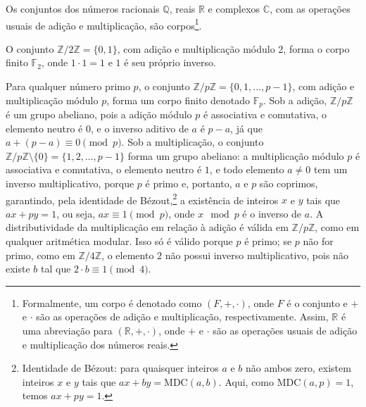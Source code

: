 \begin{example}
Os conjuntos dos números racionais $\mathbb{Q}$, reais $\mathbb{R}$ e complexos $\mathbb{C}$,
com as operações usuais de adição e multiplicação, são corpos\footnote{Formalmente, um corpo
  é denotado como $(F, +, \cdot)$, onde $F$ é o conjunto e $+$ e $\cdot$ são as operações de
  adição e multiplicação, respectivamente. Assim, $\mathbb{R}$ é uma abreviação para 
  $(\mathbb{R}, +, \cdot)$, onde $+$ e $\cdot$ são as operações usuais de adição e 
  multiplicação dos números reais.}.
\end{example}

\begin{example}
O conjunto $\mathbb{Z}/2\mathbb{Z} = \{0, 1\}$, com adição e multiplicação módulo 2,
forma o corpo finito $\mathbb{F}_2$, onde $1 \cdot 1 = 1$ e $1$ é seu próprio inverso.
\end{example}

\begin{example}
Para qualquer número primo $p$, o conjunto
$\mathbb{Z}/p\mathbb{Z} = \{0, 1, \ldots, p-1\}$, com adição e multiplicação
módulo $p$, forma um corpo finito denotado $\mathbb{F}_p$. Sob a
adição, $\mathbb{Z}/p\mathbb{Z}$ é um grupo abeliano, pois a adição módulo
$p$ é associativa e comutativa, o elemento neutro é $0$, e o inverso
aditivo de $a$ é $p - a$, já que $a + (p - a) \equiv 0 \pmod{p}$.
Sob a multiplicação, o conjunto $\mathbb{Z}/p\mathbb{Z} \setminus \{0\} = \{1, 2, \ldots, p-1\}$ 
forma um grupo abeliano: a multiplicação módulo $p$ é associativa e comutativa,
o elemento neutro é $1$, e todo elemento $a \neq 0$ tem um inverso multiplicativo,
porque $p$ é primo e, portanto, $a$ e $p$ são coprimos, garantindo, pela identidade de Bézout,\footnote{
  Identidade de Bézout: para quaisquer inteiros $a$ e $b$ não ambos zero,
  existem inteiros $x$ e $y$ tais que $ax + by = \text{MDC}(a, b)$.
  Aqui, como $\text{MDC}(a, p) = 1$, temos $ax + py = 1$.%
}
a existência
de inteiros $x$ e $y$ tais que $a x + p y = 1$, ou seja, $a x \equiv 1 \pmod{p}$,
onde $x \mod p$ é o inverso de $a$. A distributividade da multiplicação
em relação à adição é válida em $\mathbb{Z}/p\mathbb{Z}$, como em qualquer
aritmética modular. Isso só é válido porque $p$ é primo; se $p$ não for
primo, como em $\mathbb{Z}/4\mathbb{Z}$, o elemento $2$ não possui
inverso multiplicativo, pois não existe $b$ tal que $2 \cdot b \equiv 1 \pmod{4}$.
\end{example}

